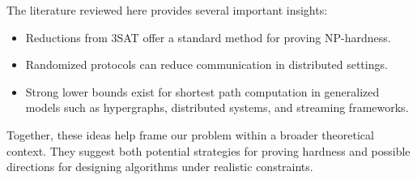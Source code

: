 The literature reviewed here provides several important insights:
\begin{itemize}
    \item Reductions from 3SAT offer a standard method for proving NP-hardness.
    \item Randomized protocols can reduce communication in distributed settings.
    \item Strong lower bounds exist for shortest path computation in generalized
    models such as hypergraphs, distributed systems, and streaming frameworks.
\end{itemize}

Together, these ideas help frame our problem within a broader theoretical
context. They suggest both potential strategies for proving hardness and
possible directions for designing algorithms under realistic constraints.

